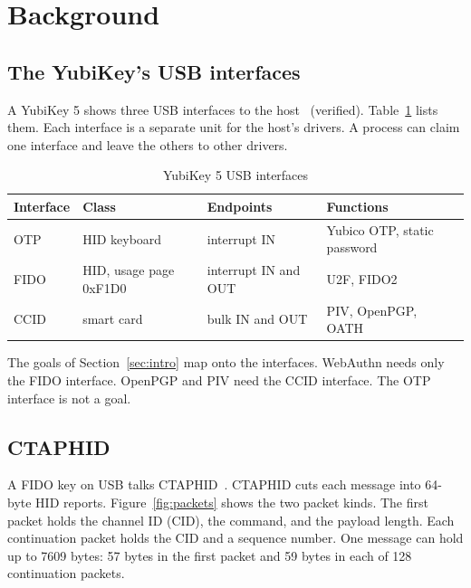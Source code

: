 \section{Background}
\label{sec:background}

\subsection{The YubiKey's USB interfaces}

A YubiKey 5 shows three USB interfaces to the host~\cite{yk-usb}
(verified). Table~\ref{tab:interfaces} lists them. Each interface is a
separate unit for the host's drivers. A process can claim one interface and
leave the others to other drivers.

\begin{table}[t]
\centering
\caption{YubiKey 5 USB interfaces}
\label{tab:interfaces}
\scriptsize
\begin{tabular}{@{}l>{\raggedright\arraybackslash}p{17mm}>{\raggedright\arraybackslash}p{15mm}>{\raggedright\arraybackslash}p{23mm}@{}}
\toprule
Interface & Class & Endpoints & Functions \\
\midrule
OTP & HID keyboard & interrupt IN & Yubico OTP, static password \\
FIDO & HID, usage page 0xF1D0 & interrupt IN and OUT & U2F, FIDO2 \\
CCID & smart card & bulk IN and OUT & PIV, OpenPGP, OATH \\
\bottomrule
\end{tabular}
\end{table}

The goals of Section~\ref{sec:intro} map onto the interfaces. WebAuthn needs
only the FIDO interface. OpenPGP and PIV need the CCID interface. The OTP
interface is not a goal.

\subsection{CTAPHID}

A FIDO key on USB talks CTAPHID~\cite{ctap21}. CTAPHID cuts each message into
64-byte HID reports. Figure~\ref{fig:packets} shows the two packet kinds. The
first packet holds the channel ID (CID), the command, and the payload length.
Each continuation packet holds the CID and a sequence number. One message can
hold up to 7609 bytes: 57 bytes in the first packet and 59 bytes in each of
128 continuation packets.


